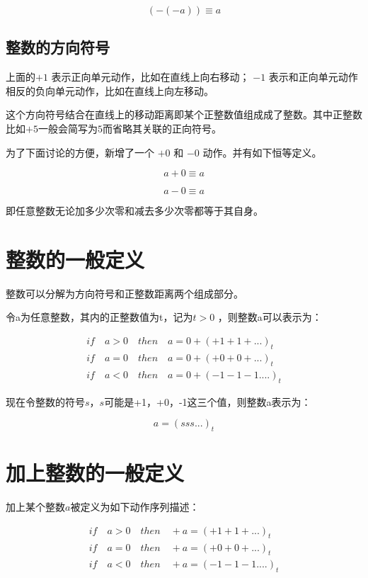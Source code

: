 \documentclass[12pt,oneside]{book}
\begin{document}
\begin{equation}
(-(-a)) \equiv a
\end{equation}


\subsection{整数的方向符号}
上面的$+1$ 表示正向单元动作，比如在直线上向右移动； $-1$ 表示和正向单元动作相反的负向单元动作，比如在直线上向左移动。

这个方向符号结合在直线上的移动距离即某个正整数值组成成了整数。其中正整数比如$+5$一般会简写为$5$而省略其关联的正向符号。

为了下面讨论的方便，新增了一个 $+0$ 和 $-0$ 动作。并有如下恒等定义。

\begin{equation}
a +0 \equiv a
\end{equation}

\begin{equation}
a -0 \equiv a
\end{equation}

即任意整数无论加多少次零和减去多少次零都等于其自身。

\section{整数的一般定义}
整数可以分解为方向符号和正整数距离两个组成部分。

令a为任意整数，其内的正整数值为t，记为$t>0$ ，则整数a可以表示为：

\begin{align*}
if \quad a>0 \quad then \quad a=0+(+1+1+...)_t\\
if \quad a=0 \quad then \quad a=0+(+0+0+...)_t\\
if \quad a<0 \quad then \quad a=0+(-1-1-1....)_t
\end{align*}

现在令整数的符号$s$，$s$可能是+1，+0，-1这三个值，则整数a表示为：

\[
a = (sss...)_t
\]

\section{加上整数的一般定义}
加上某个整数$a$被定义为如下动作序列描述：

\begin{align*}
if \quad a>0 \quad then \quad +a=(+1+1+...)_t\\
if \quad a=0 \quad then \quad +a=(+0+0+...)_t\\
if \quad a<0 \quad then \quad +a=(-1-1-1....)_t
\end{align*}
\end{document}
